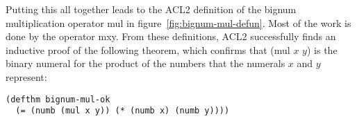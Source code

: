 Putting this all together leads to the ACL2 definition
of the bignum multiplication operator \textsf{mul} in
figure~\ref{fig:bignum-mul-defun}. %
Most of the work is done by the operator \textsf{mxy}.
From these definitions, ACL2 successfully finds an
inductive proof of the following theorem,
which confirms that \textsf{(mul $x$ $y$)} is the binary numeral
for the product of the numbers that the numerals $x$ and $y$ represent:

\label{bignum-mul-thm}
\begin{code}
\begin{verbatim}
(defthm bignum-mul-ok
  (= (numb (mul x y)) (* (numb x) (numb y))))
\end{verbatim}
\end{code}

\begin{exercises}
\end{exercises}


